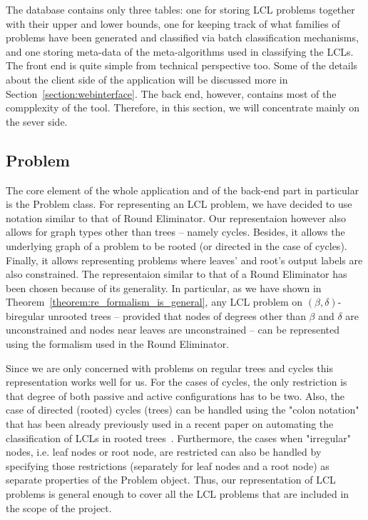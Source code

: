 The database contains only three tables: one for
storing LCL problems together with their upper and
lower bounds, one for keeping track of what families of
problems have been generated and classified via batch
classification mechanisms, and one storing meta-data
of the meta-algorithms used in classifying the LCLs.
The front end is quite simple from technical perspective
too. Some of the details about the client side of the
application will be discussed more in Section~\ref{section:webinterface}.
The back end, however, contains most of the compplexity of
the tool. Therefore, in this section, we will concentrate
mainly on the sever side.

\subsection{Problem}

The core element of the whole application and of the
back-end part in particular is the Problem class.
For representing an LCL problem, we have decided
to use notation similar to that of Round
Eliminator. Our representaion however also
allows for graph types other than trees -- namely cycles.
Besides, it allows the underlying graph of a problem
to be rooted (or directed in the case of cycles).
Finally, it allows representing problems where
leaves' and root's output labels are also constrained.
The representaion similar to that of a Round
Eliminator has been chosen because of its generality.
In particular, as we have shown in Theorem~\ref{theorem:re_formalism_is_general},
any LCL problem
on $(\beta, \delta)$-biregular unrooted trees -- provided
that nodes of degrees other than $\beta$ and $\delta$ are unconstrained
and nodes near leaves are unconstrained -- can be represented
using the formalism used in the Round Eliminator.

Since we are only concerned with problems on regular trees and cycles
this representation works well for us. For the cases of cycles,
the only restriction is that degree of both passive and
active configurations has to be two. Also, the case
of directed (rooted) cycles (trees) can be handled
using the "colon notation" that has been already
previously used in a recent paper on automating
the classification of LCLs in rooted trees~\cite{Balliu2021}.
Furthermore, the cases when "irregular" nodes, i.e.
leaf nodes or root node, are restricted can also
be handled by specifying those restrictions
(separately for leaf nodes and a root node)
as separate properties of the Problem object.
Thus, our representation of LCL problems is general
enough to cover all the LCL problems that are
included in the scope of the project.

